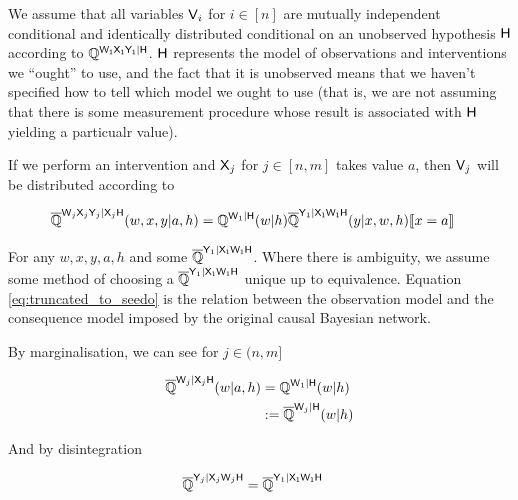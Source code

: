 We assume that all variables $\mathsf{V}_i$ for $i\in [n]$ are mutually independent conditional and identically distributed conditional on an unobserved hypothesis $\mathsf{H}$ according to $\mathbb{Q}^{\mathsf{W_1X_1Y_1}|\mathsf{H}}$. $\mathsf{H}$ represents the model of observations and interventions we ``ought'' to use, and the fact that it is unobserved means that we haven't specified how to tell which model we ought to use (that is, we are not assuming that there is some measurement procedure whose result is associated with $\mathsf{H}$ yielding a particualr value).

If we perform an intervention and $\mathsf{X}_{j}$ for $j\in [n,m]$ takes value $a$, then $\mathsf{V}_j$ will be distributed according to

\begin{align}
    \overline{\mathbb{Q}}^{\mathsf{W}_j\mathsf{X}_j\mathsf{Y}_j|\mathsf{X}_j\mathsf{H}}(w,x,y|a,h) &= \mathbb{Q}^{\mathsf{W}_1|\mathsf{H}}(w|h)\overline{\mathbb{Q}}^{\mathsf{Y}_1|\mathsf{X_1W_1H}}(y|x,w,h)\llbracket x=a \rrbracket\label{eq:truncated_to_seedo}
\end{align}


For any $w,x,y,a,h$ and some $\overline{\mathbb{Q}}^{\mathsf{Y}_1|\mathsf{X_1W_1H}}$. Where there is ambiguity, we assume some method of choosing a $\overline{\mathbb{Q}}^{\mathsf{Y}_1|\mathsf{X_1W_1H}}$ unique up to equivalence. Equation \ref{eq:truncated_to_seedo} is the relation between the observation model and the consequence model imposed by the original causal Bayesian network.

By marginalisation, we can see for $j\in (n,m]$

\begin{align}
    \overline{\mathbb{Q}}^{\mathsf{W}_j|\mathsf{X}_j\mathsf{H}}(w|a,h) &= \mathbb{Q}^{\mathsf{W}_1|\mathsf{H}}(w|h)\\
    &:= \overline{\mathbb{Q}}^{\mathsf{W}_j|\mathsf{H}}(w|h)
\end{align}

And by disintegration

\begin{align}
    \overline{\mathbb{Q}}^{\mathsf{Y}_j|\mathsf{X}_j\mathsf{W}_j\mathsf{H}} &= \overline{\mathbb{Q}}^{\mathsf{Y}_1|\mathsf{X_1W_1H}}
\end{align}

